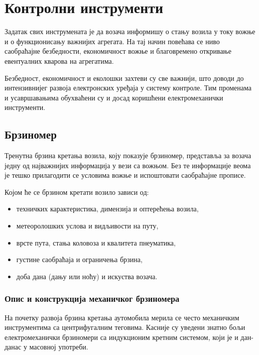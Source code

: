 \documentclass{report}
\begin{document}


\chapter{Контролни инструменти}

Задатак свих инструмената је да возача информишу о 
стању возила у току вожње и о функционисању важнијих агрегата. 
На тај начин повећава се ниво саобраћајне безбедности, економичност 
вожње и благовремено откривање евентуалних кварова на агрегатима.

Безбедност, економичност и еколошки захтеви су све важнији, што доводи 
до интензивнијег развоја електронских уређаја у систему контроле. Тим 
променама и усавршавањима обухваћени су и досад коришћени електромеханички инструменти.

\section{Брзиномер}

Тренутна брзина кретања возила, коју показује брзиномер, представља за возача једну од најважнијих информација у вези са вожњом. Без те информације веома је тешко прилагодити се условима вожње и испоштовати саобраћајне прописе.

Којом ће се брзином кретати возило зависи од:
\begin{itemize}
    \item техничких карактеристика, димензија и оптерећења возила,
    \item метеоролошких услова и видљивости на путу,
    \item врсте пута, стања коловоза и квалитета пнеуматика,
    \item густине саобраћаја и ограничења брзина,
    \item доба дана (дању или ноћу) и искуства возача.
\end{itemize}

\subsection{Опис и конструкција механичког брзиномера}

На почетку развоја брзина кретања аутомобила мерила се често механичким инструментима са центрифугалним теговима. 
Касније су уведени знатно бољи електромеханички брзиномери са индукционим кретним системом, који је и дан-данас у масовној употреби.
\end{document}
